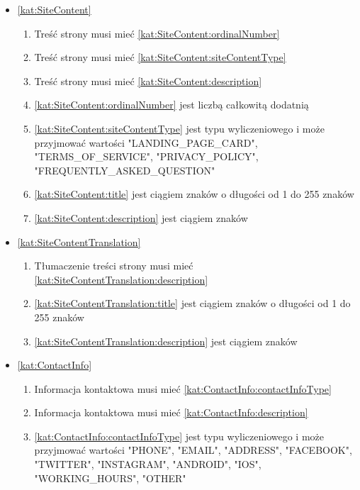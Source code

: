 \begin{itemize}[label={\textbf{Ograniczenia dla}}, wide, labelwidth=!, labelindent=0pt]
    \item\ref{kat:SiteContent}
    \begin{enumerate}[label={\textbf{OGR/\protect\threedigits{\arabic{enumi}}}}, wide, labelwidth=!, align=left, leftmargin=3cm, resume]
        \item Treść strony musi mieć \ref{kat:SiteContent:ordinalNumber}
        \item Treść strony musi mieć \ref{kat:SiteContent:siteContentType}
        \item Treść strony musi mieć \ref{kat:SiteContent:description}
        \item \ref{kat:SiteContent:ordinalNumber} jest liczbą całkowitą dodatnią
        \item \ref{kat:SiteContent:siteContentType} jest typu wyliczeniowego i może przyjmować wartości "LANDING\_PAGE\_CARD", "TERMS\_OF\_SERVICE", "PRIVACY\_POLICY", "FREQUENTLY\_ASKED\_QUESTION"
        \item \ref{kat:SiteContent:title} jest ciągiem znaków o długości od 1 do 255 znaków
        \item \ref{kat:SiteContent:description} jest ciągiem znaków
    \end{enumerate}
    \item\ref{kat:SiteContentTranslation}
    \begin{enumerate}[label={\textbf{OGR/\protect\threedigits{\arabic{enumi}}}}, wide, labelwidth=!, align=left, leftmargin=3cm, resume]
        \item Tłumaczenie treści strony musi mieć \ref{kat:SiteContentTranslation:description}
        \item \ref{kat:SiteContentTranslation:title} jest ciągiem znaków o długości od 1 do 255 znaków
        \item \ref{kat:SiteContentTranslation:description} jest ciągiem znaków
    \end{enumerate}
    \item\ref{kat:ContactInfo}
    \begin{enumerate}[label={\textbf{OGR/\protect\threedigits{\arabic{enumi}}}}, wide, labelwidth=!, align=left, leftmargin=3cm, resume]
        \item Informacja kontaktowa musi mieć \ref{kat:ContactInfo:contactInfoType}
        \item Informacja kontaktowa musi mieć \ref{kat:ContactInfo:description}
        \item \ref{kat:ContactInfo:contactInfoType} jest typu wyliczeniowego i może przyjmować wartości "PHONE", "EMAIL", "ADDRESS", "FACEBOOK", "TWITTER", "INSTAGRAM", "ANDROID", "IOS", "WORKING_HOURS", "OTHER"

\end{enumerate}
\end{itemize}
